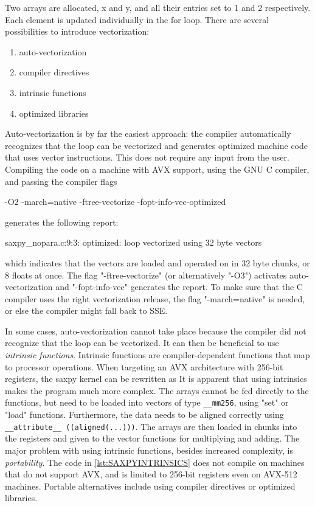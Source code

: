 \noindent Two arrays are allocated, x and y, and all their entries set to 1 and 2 respectively. Each element is updated individually in the for loop. There are several possibilities to introduce vectorization:
\begin{enumerate}
\item auto-vectorization
\item compiler directives
\item intrinsic functions
\item optimized libraries
\end{enumerate}
\noindent Auto-vectorization is by far the easiest approach: the compiler automatically recognizes that the loop can be vectorized and generates optimized machine code that uses vector instructions. This does not require any input from the user. Compiling the code on a machine with AVX support, using the GNU C compiler, and passing the compiler flags 
\begin{code}
-O2 -march=native -ftree-vectorize -fopt-info-vec-optimized
\end{code}
\noindent generates the following report:
\begin{code}
saxpy_nopara.c:9:3: optimized: loop vectorized using 32 byte vectors
\end{code}
\noindent which indicates that the vectors are loaded and operated on in 32 byte chunks, or 8 floats at once. The flag "-ftree-vectorize" (or alternatively "-O3") activates auto-vectorization and "-fopt-info-vec" generates the report. To make sure that the C compiler uses the right vectorization release, the flag "-march=native" is needed, or else the compiler might fall back to SSE. 

In some cases, auto-vectorization cannot take place because the compiler did not recognize that the loop can be vectorized. It can then be beneficial to use \emph{intrinsic functions}. Intrinsic functions are compiler-dependent functions that map to processor operations. When targeting an AVX architecture with 256-bit registers, the saxpy kernel can be rewritten as
\noindent It is apparent that using intrinsics makes the program much more complex. The arrays cannot be fed directly to the functions, but need to be loaded into vectors of type \texttt{\_\_mm256}, using "set" or "load" functions. Furthermore, the data needs to be aligned correctly using \texttt{\_\_attribute\_\_ ((aligned(...)))}. The arrays are then loaded in chunks into the registers and given to the vector functions for multiplying and adding. The major problem with using intrinsic functions, besides increased complexity, is \emph{portability}. The code in \ref{lst:SAXPYINTRINSICS} does not compile on machines that do not support AVX, and is limited to 256-bit registers even on AVX-512 machines. Portable alternatives include using compiler directives or optimized libraries. 

